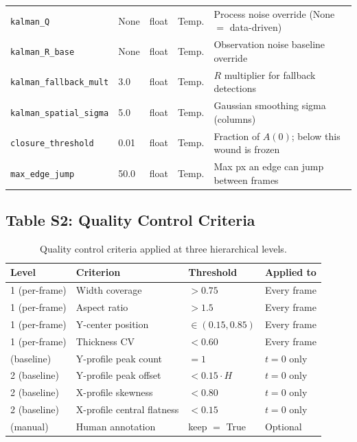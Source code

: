 \begin{table}[H]
\begin{tabular}{llrlp{5.5cm}}
    \texttt{kalman\_Q}          & None  & float & Temp. & Process noise override (None $=$ data-driven) \\
    \texttt{kalman\_R\_base}    & None  & float & Temp. & Observation noise baseline override \\
    \texttt{kalman\_fallback\_mult} & 3.0 & float & Temp. & $R$ multiplier for fallback detections \\
    \texttt{kalman\_spatial\_sigma} & 5.0 & float & Temp. & Gaussian smoothing sigma (columns) \\
    \addlinespace
    \texttt{closure\_threshold} & 0.01  & float & Temp. & Fraction of $A(0)$; below this wound is frozen \\
    \texttt{max\_edge\_jump}    & 50.0  & float & Temp. & Max px an edge can jump between frames \\
    \bottomrule
  \end{tabular}
\end{table}

\subsection*{Table S2: Quality Control Criteria}

\begin{table}[H]
  \centering
  \caption{Quality control criteria applied at three hierarchical levels.}\label{tab:qc_levels}
  \begin{tabular}{llll}
    \toprule
    Level & Criterion & Threshold & Applied to \\
    \midrule
    1 (per-frame) & Width coverage & $> 0.75$ & Every frame \\
    1 (per-frame) & Aspect ratio & $> 1.5$ & Every frame \\
    1 (per-frame) & Y-center position & $\in (0.15, 0.85)$ & Every frame \\
    1 (per-frame) & Thickness CV & $< 0.60$ & Every frame \\
    \addlinespace
    2 (baseline) & Y-profile peak count & $= 1$ & $t = 0$ only \\
    2 (baseline) & Y-profile peak offset & $< 0.15 \cdot H$ & $t = 0$ only \\
    2 (baseline) & X-profile skewness & $< 0.80$ & $t = 0$ only \\
    2 (baseline) & X-profile central flatness & $< 0.15$ & $t = 0$ only \\
    \addlinespace
    3 (manual) & Human annotation & keep $=$ True & Optional \\
    \bottomrule
  \end{tabular}
\end{table}

